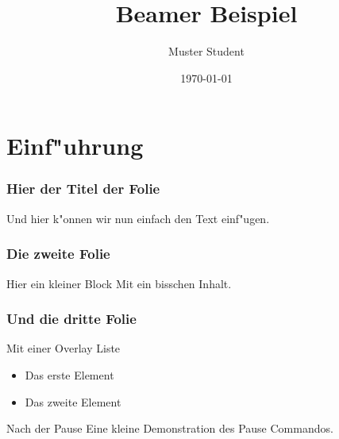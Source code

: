 \documentclass{beamer}
\begin{document}
\title{Beamer Beispiel}
\author{Muster Student}
\date{\today}

\begin{frame}
	\titlepage
\end{frame}


\section{Einf"uhrung}

\begin{frame}
	\frametitle{Hier der Titel der Folie}

	Und hier k"onnen wir nun einfach den Text einf"ugen.
\end{frame}

\begin{frame}
	\frametitle{Die zweite Folie}


	\begin{block}{Hier ein kleiner Block}
		Mit ein bisschen Inhalt.
	\end{block}
\end{frame}

\begin{frame}
	\frametitle{Und die dritte Folie}

	\begin{block}{Mit einer Overlay Liste}
		\begin{itemize}[<+->]
			\item Das erste Element
			\item Das zweite Element
		\end{itemize}
	\end{block}
	\pause
	\begin{block}{Nach der Pause}
		Eine kleine Demonstration des Pause Commandos.
	\end{block}
\end{frame}
\end{document}
